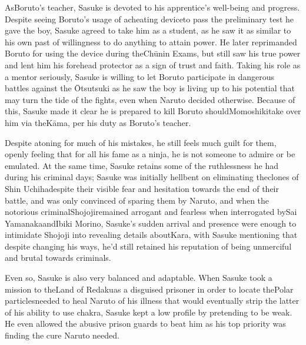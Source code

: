 \documentclass[a4paper,12pt]{article}
\begin{document}
AsBoruto's teacher, Sasuke is devoted to his apprentice's well-being and progress. Despite seeing Boruto's usage of acheating deviceto pass the preliminary test he gave the boy, Sasuke agreed to take him as a student, as he saw it as similar to his own past of willingness to do anything to attain power. He later reprimanded Boruto for using the device during theChūnin Exams, but still saw his true power and lent him his forehead protector as a sign of trust and faith. Taking his role as a mentor seriously, Sasuke is willing to let Boruto participate in dangerous battles against the Ōtsutsuki as he saw the boy is living up to his potential that may turn the tide of the fights, even when Naruto decided otherwise. Because of this, Sasuke made it clear he is prepared to kill Boruto shouldMomoshikitake over him via theKāma, per his duty as Boruto's teacher.\\ \par \vspace{0.5cm}

Despite atoning for much of his mistakes, he still feels much guilt for them, openly feeling that for all his fame as a ninja, he is not someone to admire or be emulated. At the same time, Sasuke retains some of the ruthlessness he had during his criminal days; Sasuke was initially hellbent on eliminating theclones of Shin Uchihadespite their visible fear and hesitation towards the end of their battle, and was only convinced of sparing them by Naruto, and when the notorious criminalShojojiremained arrogant and fearless when interrogated bySai YamanakaandIbiki Morino, Sasuke's sudden arrival and presence were enough to intimidate Shojoji into revealing details aboutKara, with Sasuke mentioning that despite changing his ways, he'd still retained his reputation of being unmerciful and brutal towards criminals.\\ \par \vspace{0.5cm}

Even so, Sasuke is also very balanced and adaptable. When Sasuke took a mission to theLand of Redakuas a disguised prisoner in order to locate thePolar particlesneeded to heal Naruto of his illness that would eventually strip the latter of his ability to use chakra, Sasuke kept a low profile by pretending to be weak. He even allowed the abusive prison guards to beat him as his top priority was finding the cure Naruto needed.\\ \par \vspace{0.5cm}
\end{document}
